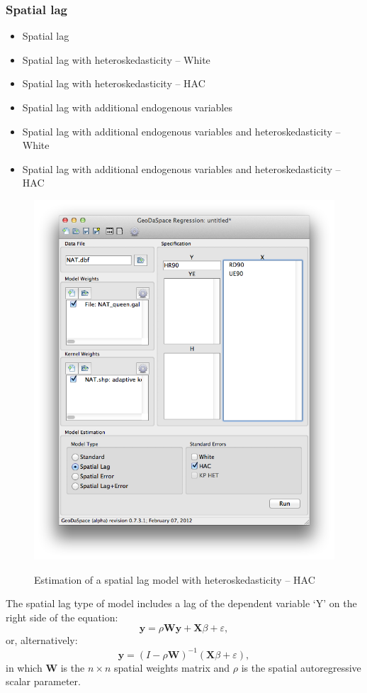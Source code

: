 \documentclass{article}
\begin{document}
\subsubsection*{Spatial lag}
\begin{itemize}
\item Spatial lag
\item Spatial lag with heteroskedasticity -- White
\item Spatial lag with heteroskedasticity -- HAC
\item Spatial lag with additional endogenous variables
\item Spatial lag with additional endogenous variables and heteroskedasticity -- White
\item Spatial lag with additional endogenous variables and heteroskedasticity -- HAC
\end{itemize}

\begin{figure}[htb]
\begin{center}
\includegraphics[width=0.7\linewidth]{haclag.png}\\
\caption{Estimation of a spatial lag model with heteroskedasticity -- HAC}
\label{f:haclag}
\end{center}
\end{figure}

The spatial lag type of model includes a lag of the dependent variable `Y' on the right side of the equation:
\begin{equation}
\mathbf{y} =  \rho \mathbf{W} \mathbf{y} + \mathbf{X}\beta + \varepsilon,
\end{equation}
or, alternatively:
\begin{equation}
\mathbf{y} =  (I - \rho \mathbf{W})^{-1} (\mathbf{X}\beta + \varepsilon),
\end{equation}
in which $\mathbf{W}$ is the $n \times n$ spatial weights matrix and $\rho$ is the spatial autoregressive scalar parameter.
\end{document}
